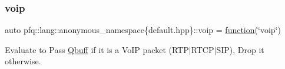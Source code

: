 \subsubsection{\texorpdfstring{voip}{voip}}
{\footnotesize\ttfamily auto pfq\+::lang\+::anonymous\+\_\+namespace\{default.\+hpp\}\+::voip = \hyperlink{namespacepfq_1_1lang_a1a4638059d700ae08d0ca63886ff2bb3}{function}(\char`\"{}voip\char`\"{})}



Evaluate to {\ttfamily Pass} \hyperlink{structpfq_1_1lang_1_1Qbuff}{Qbuff} if it is a Vo\+IP packet (R\+T\+P$\vert$\+R\+T\+C\+P$\vert$\+S\+IP), {\ttfamily Drop} it otherwise. 


